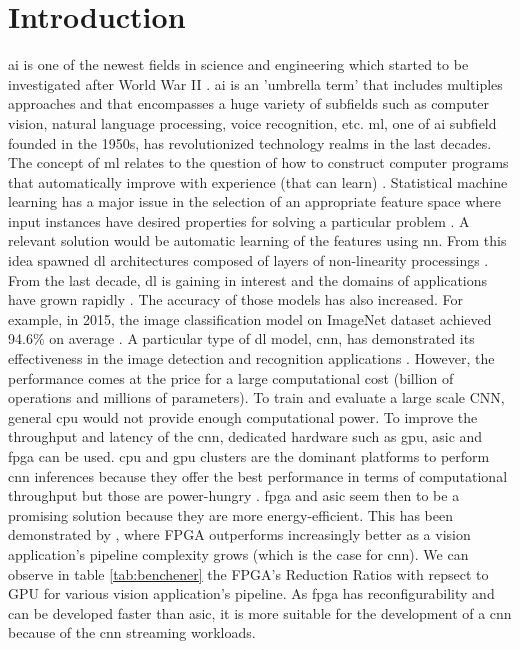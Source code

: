 \chapter{Introduction} \label{chap:intr}
%
\acrfull{ai} is one of the newest fields in science and engineering which started to be investigated  after World War II \cite{russell_artificial_2009}. \acrshort{ai} is an 'umbrella term' that includes multiples approaches and that encompasses a huge variety of subfields such as computer vision, natural language processing, voice recognition, etc.
\acrfull{ml}, one of \acrshort{ai} subfield founded in the 1950s, has revolutionized technology realms in the last decades. The concept of \acrshort{ml} relates to the question of how to construct computer programs that automatically improve with experience (that can learn) \cite{mitchell_machine_1997}.
Statistical machine learning has a major issue in the selection of an appropriate feature space where input instances have desired properties for solving a particular problem \cite{arnold_introduction_2011}. A relevant solution would be automatic learning of the features using \acrfull{nn}. From this idea spawned \acrfull{dl} architectures composed of layers of non-linearity processings \cite{alom_history_2018}. From the last decade, \acrshort{dl} is gaining in interest and the domains of applications have grown rapidly \cite{wason_deep_2018}. The accuracy of those models has also increased. For example, in 2015, the image classification model on ImageNet dataset achieved 94.6\% on average \cite{russakovsky_imagenet_2015}.\newline \newline
%
A particular type of \acrshort{dl} model, \acrfull{cnn}, has demonstrated its effectiveness in the image detection and recognition applications \cite{shawahna_fpga-based_2019}. However, the performance comes at the price for a large computational cost (billion of operations and millions of parameters). To train and evaluate a large scale CNN, general \acrfull{cpu} would not provide enough computational power. To improve the throughput and latency of the \acrshort{cnn}, dedicated hardware such as \acrfull{gpu}, \acrfull{asic} and \acrfull{fpga} can be used. \acrshort{cpu} and \acrshort{gpu} clusters are the dominant platforms to perform \acrshort{cnn} inferences because they offer the best performance in terms of computational throughput but those are power-hungry \cite{liu_uniform_2019}.
\acrshort{fpga} and \acrshort{asic} seem then to be a promising solution because they are more energy-efficient. This has been demonstrated by \cite{qasaimeh_comparing_2019}, where FPGA outperforms increasingly better as a vision application’s pipeline complexity grows (which is the case for \acrshort{cnn}). We can observe in table \ref{tab:benchener} the FPGA’s Reduction Ratios with repsect to GPU for various vision application’s pipeline. As \acrshort{fpga} has reconfigurability and can be developed faster than \acrshort{asic}, it is more suitable for the development of a \acrshort{cnn} because of the \acrshort{cnn} streaming workloads.
